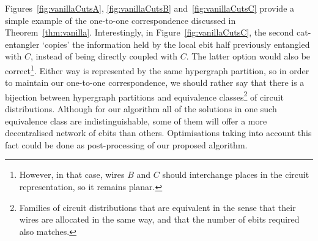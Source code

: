 \begin{comment}
\begin{algorithm}[caption={Builds the distributed circuit determined by the input hypergraph partition. The hypergraph partition is provided as an assignment \(qpuOf \colon \mathbb{N} \to \mathbb{N}\) which indicates the QPU number of the given wire},label={code:distributeVanilla}]
input: circuit, $qpuOf$
output: distributed
begin
  distributed $\gets$ $emptyCircuit$
  foreach wire in circuit do
    thisQPU = $qpuOf$(wire)
    activeConnections $\gets$ $\varnothing$
    foreach gate in wire do
      if gate == CNOT and $controlOf$(gate) == wire then
        targetQPU = $qpuOf$($targetOf$(gate))
        if targetQPU == thisQPU then
          distributed.$addCNOTAt$(wire,target)
        else
          ebit $\gets$ activeConnections.$at$(targetQPU)
          if ebit == null then
            ebit $\gets$ $distillEbit$(thisQPU, targetQPU)
            distributed.$addCatEntangler$(ebit, wire)
            activeConnections.$at$(targetQPU) $\gets$ ebit
          distributed.$addCNOTAt$(ebit,$targetOf$(gate))
      else
        distributed.$addGateAt$(gate,wire)
end
\end{algorithm}
\end{comment}


\begin{remark} \normalfont
Figures~\ref{fig:vanillaCutsA}, \ref{fig:vanillaCutsB} and~\ref{fig:vanillaCutsC} provide a simple example of the one-to-one correspondence discussed in Theorem~\ref{thm:vanilla}. Interestingly, in Figure~\ref{fig:vanillaCutsC}, the second cat-entangler `copies' the information held by the local ebit half previously entangled with \(C\), instead of being directly coupled with \(C\). The latter option would also be correct\footnote{However, in that case, wires \(B\) and \(C\) should interchange places in the circuit representation, so it remains planar.}. Either way is represented by the same hypergraph partition, so in order to maintain our one-to-one correspondence, we should rather say that there is a bijection between hypergraph partitions and equivalence classes\footnote{Families of circuit distributions that are equivalent in the sense that their wires are allocated in the same way, and that the number of ebits required also matches.} of circuit distributions. Although for our algorithm all of the solutions in one such equivalence class are indistinguishable, some of them will offer a more decentralised network of ebits than others. Optimisations taking into account this fact could be done as post-processing of our proposed algorithm.
\end{remark}

